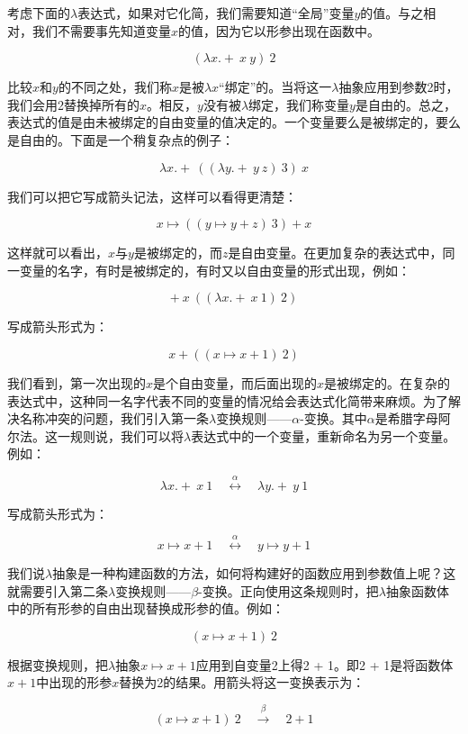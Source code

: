 \documentclass{article}
\begin{document}
考虑下面的$\lambda$表达式，如果对它化简，我们需要知道“全局”变量$y$的值。与之相对，我们不需要事先知道变量$x$的值，因为它以形参出现在函数中。

\[
(\lambda x . +\ x\ y)\ 2
\]

比较$x$和$y$的不同之处，我们称$x$是被$\lambda x$“绑定”的。当将这一$\lambda$抽象应用到参数2时，我们会用2替换掉所有的$x$。相反，$y$没有被$\lambda$绑定，我们称变量$y$是自由的。总之，表达式的值是由未被绑定的自由变量的值决定的。一个变量要么是被绑定的，要么是自由的。下面是一个稍复杂点的例子：

\[
\lambda x . +\ ((\lambda y . +\ y\ z)\ 3)\ x
\]

我们可以把它写成箭头记法，这样可以看得更清楚：

\[
x \mapsto ((y \mapsto y + z)\ 3) + x
\]

这样就可以看出，$x$与$y$是被绑定的，而$z$是自由变量。在更加复杂的表达式中，同一变量的名字，有时是被绑定的，有时又以自由变量的形式出现，例如：

\[
+\ x\ ((\lambda x . +\ x\ 1)\ 2)
\]

写成箭头形式为：

\[
x + ((x \mapsto x + 1)\ 2)
\]

我们看到，第一次出现的$x$是个自由变量，而后面出现的$x$是被绑定的。在复杂的表达式中，这种同一名字代表不同的变量的情况给会表达式化简带来麻烦。为了解决名称冲突的问题，我们引入第一条$\lambda$变换规则——$\alpha$-变换。其中$\alpha$是希腊字母阿尔法。这一规则说，我们可以将$\lambda$表达式中的一个变量，重新命名为另一个变量。例如：

\[
\lambda x . +\ x\ 1 \quad \overset{\alpha}{\longleftrightarrow} \quad \lambda y . +\ y\ 1
\]


写成箭头形式为：

\[
x \mapsto x + 1 \quad \overset{\alpha}{\longleftrightarrow} \quad y \mapsto y + 1
\]

我们说$\lambda$抽象是一种构建函数的方法，如何将构建好的函数应用到参数值上呢？这就需要引入第二条$\lambda$变换规则——$\beta$-变换。正向使用这条规则时，把$\lambda$抽象函数体中的所有形参的自由出现替换成形参的值。例如：

\[
(x \mapsto x + 1)\ 2
\]

根据变换规则，把$\lambda$抽象$x \mapsto x + 1$应用到自变量2上得2 + 1。即2 + 1是将函数体$x + 1$中出现的形参$x$替换为2的结果。用箭头将这一变换表示为：

\[
(x \mapsto x + 1)\ 2 \quad \overset{\beta}{\longrightarrow} \quad 2 + 1
\]
\end{document}
